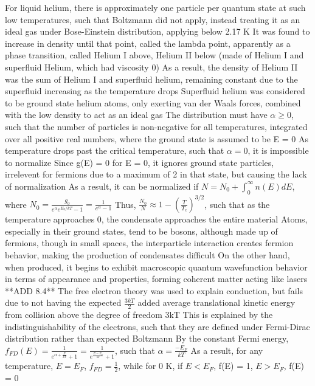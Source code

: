 \documentclass[11 pt, twoside]{article}
\newenvironment{outline*}
{
	\begin{outline}[enumerate]
	}
	{\end{outline}
}
\begin{document}
\begin{outline*}
	\2 For liquid helium, there is approximately one particle per quantum state at such low temperatures, such that Boltzmann did not apply, instead treating it as an ideal gas under Bose-Einstein distribution, applying below 2.17 K
		\3 It was found to increase in density until that point, called the lambda point, apparently as a phase transition, called Helium I above, Helium II below (made of Helium I and superfluid Helium, which had viscosity 0)
			\4 As a result, the density of Helium II was the sum of Helium I and superfluid helium, remaining constant due to the superfluid increasing as the temperature drops
			\4 Superfluid helium was considered to be ground state helium atoms, only exerting van der Waals forces, combined with the low density to act as an ideal gas
		\3 The distribution must have $\alpha \geq 0$, such that the number of particles is non-negative for all temperatures, integrated over all positive real numbers, where the ground state is assumed to be E = 0
			\4 As temperature drops past the critical temperature, such that $\alpha = 0$, it is impossible to normalize
			\4 Since g(E) = 0 for E = 0, it ignores ground state particles, irrelevent for fermions due to a maximum of 2 in that state, but causing the lack of normalization
			\4 As a result, it can be normalized if $N = N_0 + \int_0^{\infty} n(E)dE$, where $N_0 = \frac{g_0}{e^{\alpha}e^{E_0/kT} - 1} = \frac{1}{e^{\alpha} - 1}$
			\4 Thus, $\frac{N_0}{N} \approx 1 - (\frac{T}{T_c})^{3/2}$, such that as the temperature approaches 0, the condensate approaches the entire material
		\3 Atoms, especially in their ground states, tend to be bosons, although made up of fermions, though in small spaces, the interparticle interaction creates fermion behavior, making the production of condensates difficult
			\4 On the other hand, when produced, it begins to exhibit macroscopic quantum wavefunction behavior in terms of appearance and properties, forming coherent matter acting like lasers
\1 **ADD 8.4**
\1 The free electron theory was used to explain conduction, but fails due to not having the expected $\frac{3kT}{2}$ added average translational kinetic energy from collision above the degree of freedom 3kT
	\2 This is explained by the indistinguishability of the electrons, such that they are defined under Fermi-Dirac distribution rather than expected Boltzmann 
	\2 By the constant Fermi energy, $f_{FD}(E) = \frac{1}{e^{\alpha + \frac{E}{kT}} + 1} = \frac{1}{e^{\frac{E - E_F}{kT}} + 1}$, such that $\alpha = \frac{-E_F}{kT}$
		\3 As a result, for any temperature, $E = E_F$, $f_{FD} = \frac{1}{2}$, while for 0 K, if $E < E_F$, f(E) = 1, $E > E_F$, f(E) = 0

\end{outline*}
\end{document}
